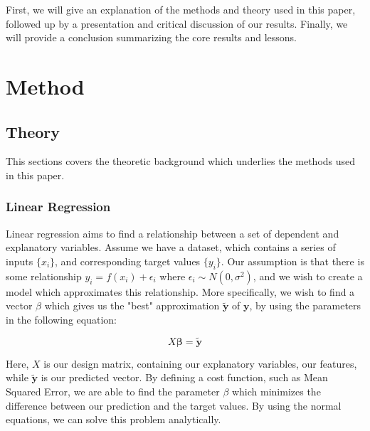 \documentclass[onecolumn,10pt,cleanfoot]{asme2ej}
\begin{document}

First, we will give an explanation of the methods and theory used in this paper, followed up by a presentation and critical discussion of our results. Finally, we will provide a conclusion summarizing the core results and lessons.

\section{Method}

\subsection{Theory}

This sections covers the theoretic background which underlies the methods used in this paper.

\subsubsection{Linear Regression}

Linear regression aims to find a relationship between a set of dependent and explanatory variables. Assume we have a dataset, which contains a series of inputs $\{x_i\}$, and corresponding target values $\{y_i\}$. Our assumption is that there is some relationship $y_i = f(x_i) + \epsilon_i$ where $\epsilon_i \sim N(0,\sigma^2)$, and we wish to create a model which approximates this relationship. More specifically, we wish to find a vector $\beta$ which gives us the "best" approximation $\bm{\tilde{y}}$ of $\bm{y}$, by using the parameters in the following equation:

\begin{equation}
X \bm{\beta} = \bm{\tilde{y}}
\label{first}
\end{equation}

Here, $X$ is our design matrix, containing our explanatory variables, our features, while $\bm{\tilde{y}}$ is our predicted vector. By defining a cost function, such as Mean Squared Error, we are able to find the parameter $\beta$ which minimizes the difference between our prediction and the target values. By using the normal equations, we can solve this problem analytically.
\end{document}
